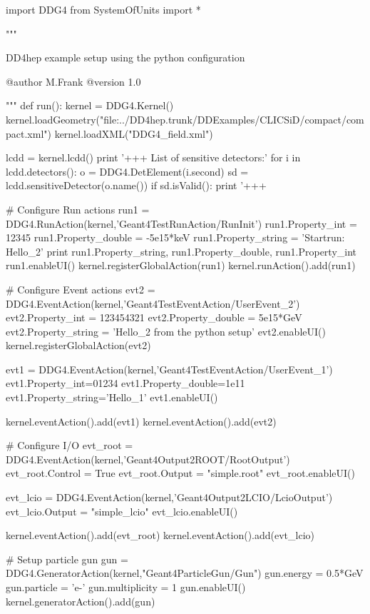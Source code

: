 \begin{code}
import DDG4
from SystemOfUnits import *

"""

   DD4hep example setup using the python configuration

   @author  M.Frank
   @version 1.0

"""
def run():
  kernel = DDG4.Kernel()
  kernel.loadGeometry("file:../DD4hep.trunk/DDExamples/CLICSiD/compact/compact.xml")
  kernel.loadXML("DDG4_field.xml")

  lcdd = kernel.lcdd()
  print '+++   List of sensitive detectors:'
  for i in lcdd.detectors(): 
    o = DDG4.DetElement(i.second)
    sd = lcdd.sensitiveDetector(o.name())
    if sd.isValid():
      print '+++  %

  # Configure Run actions
  run1 = DDG4.RunAction(kernel,'Geant4TestRunAction/RunInit')
  run1.Property_int    = 12345
  run1.Property_double = -5e15*keV
  run1.Property_string = 'Startrun: Hello_2'
  print run1.Property_string, run1.Property_double, run1.Property_int
  run1.enableUI()
  kernel.registerGlobalAction(run1)
  kernel.runAction().add(run1)

  # Configure Event actions
  evt2 = DDG4.EventAction(kernel,'Geant4TestEventAction/UserEvent_2')
  evt2.Property_int    = 123454321
  evt2.Property_double = 5e15*GeV
  evt2.Property_string = 'Hello_2 from the python setup'
  evt2.enableUI()
  kernel.registerGlobalAction(evt2)

  evt1 = DDG4.EventAction(kernel,'Geant4TestEventAction/UserEvent_1')
  evt1.Property_int=01234
  evt1.Property_double=1e11
  evt1.Property_string='Hello_1'
  evt1.enableUI()

  kernel.eventAction().add(evt1)
  kernel.eventAction().add(evt2)

  # Configure I/O
  evt_root = DDG4.EventAction(kernel,'Geant4Output2ROOT/RootOutput')
  evt_root.Control = True
  evt_root.Output = "simple.root"
  evt_root.enableUI()

  evt_lcio = DDG4.EventAction(kernel,'Geant4Output2LCIO/LcioOutput')
  evt_lcio.Output = "simple_lcio"
  evt_lcio.enableUI()

  kernel.eventAction().add(evt_root)
  kernel.eventAction().add(evt_lcio)

  # Setup particle gun
  gun = DDG4.GeneratorAction(kernel,"Geant4ParticleGun/Gun")
  gun.energy   = 0.5*GeV
  gun.particle = 'e-'
  gun.multiplicity = 1
  gun.enableUI()
  kernel.generatorAction().add(gun)


\end{code}
